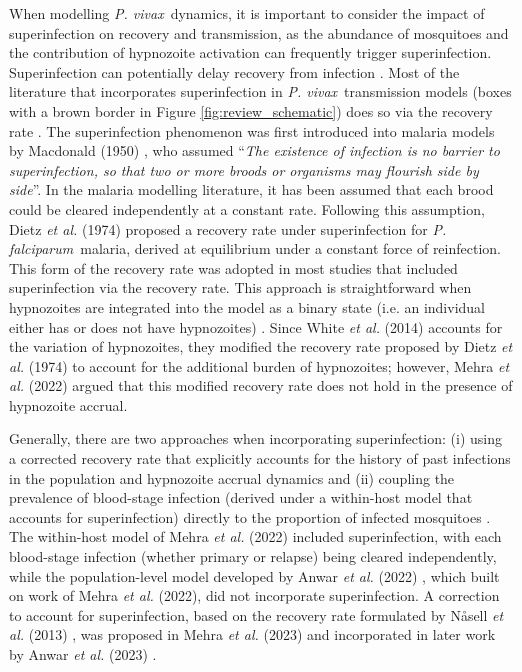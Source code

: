 \documentclass[12pt]{article}
\newcommand{\pv}{\textit{P. vivax}}
\newcommand{\pf}{\textit{P. falciparum}}
\newcommand{\etal}{\textit{et al. }}
\begin{document}
When modelling \pv~dynamics, it is important to consider the impact of superinfection on recovery and transmission, as the abundance of mosquitoes and the contribution of hypnozoite activation can frequently trigger superinfection. Superinfection can potentially delay recovery from infection \cite{smith2012ross,dietz1974malaria}. Most of the literature that incorporates superinfection in \pv~transmission models (boxes with a brown border in Figure \ref{fig:review_schematic}) \cite{ishikawa2000prevalence,ishikawa2003mathematical,fujita2006modeling,white2014modelling,white2018mathematical,silal2019malaria,nekkab2021estimated,huber2021radical,white2022potential,olaniyi2023optimal} does so via the recovery rate \cite{ishikawa2000prevalence,ishikawa2003mathematical,fujita2006modeling,white2014modelling}. The superinfection phenomenon was first introduced into malaria models by Macdonald (1950) \cite{macdonald1950}, who assumed ``\textit{The existence of infection is no barrier to superinfection, so that two or more broods or organisms may flourish side by side}''. In the malaria modelling literature, it has been assumed that each brood could be cleared independently at a constant rate. Following this assumption, Dietz \etal (1974) \cite{dietz1974malaria} proposed a recovery rate under superinfection for \pf~malaria, derived at equilibrium under a constant force of reinfection. This form of the recovery rate was adopted in most studies that included superinfection via the recovery rate. This approach is straightforward when hypnozoites are integrated into the model as a binary state (i.e. an individual either has or does not have hypnozoites) \cite{ishikawa2000prevalence,ishikawa2003mathematical,fujita2006modeling}. Since White \etal(2014) \cite{white2014modelling} accounts for the variation of hypnozoites, they modified the recovery rate proposed by Dietz \etal(1974) \cite{dietz1974malaria} to account for the additional burden of hypnozoites; however, Mehra \etal(2022) \cite{thesis_somya} argued that this modified recovery rate does not hold in the presence of hypnozoite accrual. 

Generally, there are two approaches when incorporating superinfection: (i) using a corrected recovery rate that explicitly accounts for the history of past infections in the population and hypnozoite accrual dynamics \cite{nasell2013hybrid,thesis_somya,anwar2023optimal} and (ii) coupling the prevalence of blood-stage infection (derived under a within-host model that accounts for superinfection) directly to the proportion of infected mosquitoes \cite{thesis_somya}. The within-host model of Mehra \etal(2022) \cite{mehra2022hypnozoite} included superinfection, with each blood-stage infection (whether primary or relapse) being cleared independently, while the population-level model developed by Anwar \etal(2022) \cite{anwar2022multiscale}, which built on work of Mehra \etal(2022)\cite{mehra2022hypnozoite}, did not incorporate superinfection. A correction to account for superinfection, based on the recovery rate formulated by Nåsell \textit{et al.} (2013) \cite{nasell2013hybrid}, was proposed in Mehra \etal(2023) \cite{thesis_somya} and incorporated in later work by Anwar \etal(2023) \cite{anwar2023optimal}.
\end{document}
